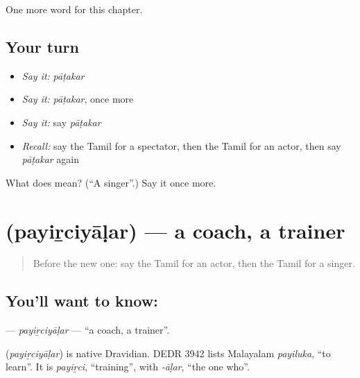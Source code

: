 \begin{grammarlens}[title={What you've built}]
One more word for this chapter.
\end{grammarlens}

\subsection*{Your turn}
\begin{itemize}
\raggedright
  \item \emph{Say it:} \emph{pāṭakar}
  \item \emph{Say it:} \emph{pāṭakar}, once more
  \item \emph{Say it:} say \emph{pāṭakar}
  \item \emph{Recall:} say the Tamil for a spectator, then the Tamil for an actor, then say \emph{pāṭakar} again
\end{itemize}

\begin{tcolorbox}[breakable,colback=teal!4,colframe=teal!35!black,title={Before you move on}]
What does  mean? (\textquotedblleft{}A singer\textquotedblright{}.) Say it once more.
\end{tcolorbox}
\section[\texorpdfstring{\ta{பயிற்சியாளர்} (payiṟciyāḷar)}{பயிற்சியாளர் (payiṟciyāḷar)}]{ (payiṟciyāḷar) — a coach, a trainer}

\label{lesson:TA-C193-payirciyalar}



\begin{quote}
Before the new one: say the Tamil for an actor, then the Tamil for a singer.
\end{quote}

\subsection*{You'll want to know: }
\textbf{} — \emph{payiṟciyāḷar} — \textquotedblleft{}a coach, a trainer\textquotedblright{}.

\begin{cousinweb}
\textbf{} (\emph{payiṟciyāḷar}) is native Dravidian. DEDR 3942 lists Malayalam \emph{payiluka}, \textquotedblleft{}to learn\textquotedblright{}. It is \emph{payiṟci}, \textquotedblleft{}training\textquotedblright{}, with \emph{-āḷar}, \textquotedblleft{}the one who\textquotedblright{}.
\end{cousinweb}

